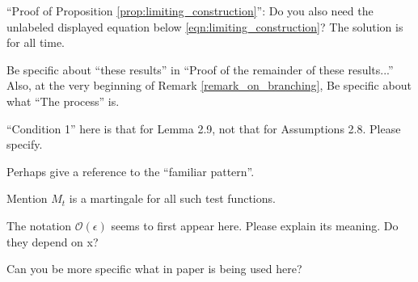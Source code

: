 
\begin{point}{}
``Proof of Proposition \ref{prop:limiting_construction}'': Do you also need the unlabeled displayed equation below
\eqref{eqn:limiting_construction}? The solution is for all time.
\end{point}


\begin{point}{\revref}
Be specific about ``these results'' in ``Proof of the remainder of these results...'' Also, at the
very beginning of Remark \ref{remark_on_branching}, Be specific about what ``The process'' is.
\end{point}


\begin{point}{\revref}
``Condition 1'' here is that for Lemma 2.9, not that for Assumptions 2.8. Please specify.
\end{point}


\begin{point}{\revref}
Perhaps give a reference to the ``familiar pattern''.
\end{point}


\begin{point}{\revref}
Mention $M_t$ is a martingale for all such test functions.
\end{point}


\begin{point}{\revref}
    The notation $\mathcal{O}(\epsilon)$ seems to first appear here. Please explain its meaning. Do they
depend on x?
\end{point}


\begin{point}{\revref}
    Can you be more specific what in paper \citet{barlow/jacka/yor:1986} is being used here?
\end{point}


